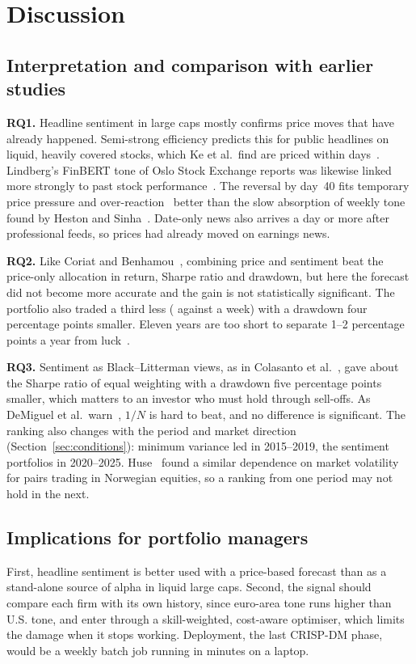 \section{Discussion}\label{sec:discussion}
\subsection{Interpretation and comparison with earlier studies}
\textbf{RQ1.} Headline sentiment in large caps mostly confirms price moves that have already happened. Semi-strong efficiency predicts this for public headlines on liquid, heavily covered stocks, which Ke et al.\ find are priced within days~\cite{fama,kekellyxiu}. Lindberg's FinBERT tone of Oslo Stock Exchange reports was likewise linked more strongly to past stock performance~\cite{lindberg}. The reversal by day~40 fits temporary price pressure and over-reaction~\cite{tetlock2007,hillert} better than the slow absorption of weekly tone found by Heston and Sinha~\cite{hestonsinha}. Date-only news also arrives a day or more after professional feeds, so prices had already moved on earnings news.

\textbf{RQ2.} Like Coriat and Benhamou~\cite{coriat}, combining price and sentiment beat the price-only allocation in return, Sharpe ratio and drawdown, but here the forecast did not become more accurate and the gain is not statistically significant. The portfolio also traded a third less (\CombinedTurnover{} against \PriceTurnover{} a week) with a drawdown four percentage points smaller. Eleven years are too short to separate 1--2 percentage points a year from luck~\cite{grinoldkahn}.

\textbf{RQ3.} Sentiment as Black--Litterman views, as in Colasanto et al.~\cite{colasanto}, gave about the Sharpe ratio of equal weighting with a drawdown five percentage points smaller, which matters to an investor who must hold through sell-offs. As DeMiguel et al.\ warn~\cite{demiguel}, $1/N$ is hard to beat, and no difference is significant. The ranking also changes with the period and market direction (Section~\ref{sec:conditions}): minimum variance led in 2015--2019, the sentiment portfolios in 2020--2025. Huse~\cite{huse} found a similar dependence on market volatility for pairs trading in Norwegian equities, so a ranking from one period may not hold in the next.

\subsection{Implications for portfolio managers}\label{sec:implications}
First, headline sentiment is better used with a price-based forecast than as a stand-alone source of alpha in liquid large caps. Second, the signal should compare each firm with its own history, since euro-area tone runs higher than U.S. tone, and enter through a skill-weighted, cost-aware optimiser, which limits the damage when it stops working. Deployment, the last CRISP-DM phase, would be a weekly batch job running in minutes on a laptop.

